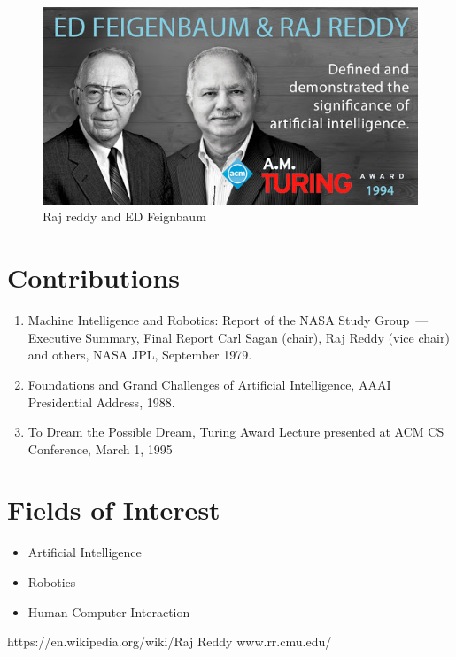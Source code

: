 \documentclass[a4paper,10pt]{article}
\begin{document}
\begin{figure}[!hbt]
  \centering
  \includegraphics[scale=0.8]{rajco.jpg}
  \caption{Raj reddy and ED Feignbaum}
  \label{rajco}
\end{figure}

\section{Contributions}
 \begin{enumerate}[label=6.\arabic*,start=1]
  \item Machine Intelligence and Robotics: Report of the NASA Study Group —
  Executive Summary, Final Report Carl Sagan (chair), Raj Reddy (vice chair) 
  and others, NASA JPL, September 1979.
  \item Foundations and Grand Challenges of Artificial Intelligence, AAAI 
  Presidential Address, 1988.
  \item To Dream the Possible Dream, Turing Award Lecture presented at ACM 
  CS Conference, March 1, 1995 
 \end{enumerate}

\section{Fields of Interest}
 \begin{itemize}
  \item Artificial Intelligence
  \item Robotics
  \item Human-Computer Interaction
 \end{itemize}

\begin{thebibliography}{10}
  https://en.wikipedia.org/wiki/Raj Reddy
  www.rr.cmu.edu/
\end{thebibliography}
\end{document}
